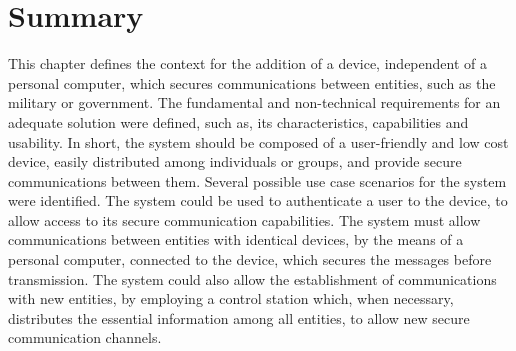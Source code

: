 
\section*{Summary}\label{chap:problem:summary}

This chapter defines the context for the addition of a device, independent of a personal computer, which secures communications between entities, such as the military or government.
The fundamental and non-technical requirements for an adequate solution were defined, such as, its characteristics, capabilities and usability. In short, the system should be composed of a user-friendly and low cost device, easily distributed among individuals or groups, and provide secure communications between them.
Several possible use case scenarios for the system were identified.
The system could be used to authenticate a user to the device, to allow access to its secure communication capabilities. The system must allow communications between entities with identical devices, by the means of a personal computer, connected to the device, which secures the messages before transmission.
The system could also allow the establishment of communications with new entities, by employing a control station which, when necessary, distributes the essential information among all entities, to allow new secure communication channels.
